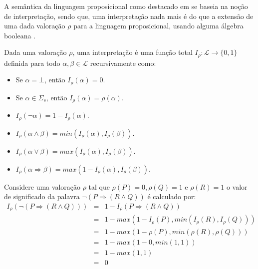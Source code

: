 A semântica da linguagem proposicional como destacado em \cite{joaoPavao2014} se baseia na noção de interpretação, sendo que, uma interpretação nada mais é do que a extensão de uma dada valoração $\rho$ para a linguagem proposicional, usando alguma álgebra booleana \cite{boole1854, boole1957}.

\begin{definicao}[Interpretação]\label{def:interpretacao}
  Dada uma valoração $\rho$, uma interpretação é uma função total $I_\rho : \mathcal{L} \rightarrow \{0,1\}$ definida para todo $\alpha, \beta \in \mathcal{L}$ recursivamente como:
  \begin{itemize}
       \item Se $\alpha = \bot$, então $I_\rho(\alpha) = 0$.
       \item Se $\alpha \in \Sigma_s$, então $I_\rho(\alpha) = \rho(\alpha)$.
       \item $I_\rho(\neg \alpha) = 1 - I_\rho(\alpha)$.
       \item $I_\rho(\alpha \land \beta) = min(I_\rho(\alpha), I_\rho(\beta))$.
       \item $I_\rho(\alpha \lor \beta) = max(I_\rho(\alpha), I_\rho(\beta))$.
       \item $I_\rho(\alpha \Rightarrow \beta) = max(1 - I_\rho(\alpha), I_\rho(\beta))$.
  \end{itemize}
\end{definicao}

\begin{exemplo}
  Considere uma valoração $\rho$ tal que $\rho(P) = 0, \rho(Q) = 1$ e $\rho(R) = 1$ o valor de significado da palavra $\neg(P \Rightarrow (R \land Q))$ é calculado por:
  \begin{eqnarray*}\label{eq:ExemploValoracaoA}
    I_\rho(\neg(P \Rightarrow (R \land Q))) & = & 1 - I_\rho(P \Rightarrow (R \land Q))\\
    & = & 1 - max(1 - I_\rho(P), min(I_\rho(R), I_\rho(Q)))\\
    & = & 1 - max(1 - \rho(P), min(\rho(R), \rho(Q)))\\
    & = & 1 - max(1 - 0, min(1, 1))\\
    & = & 1 - max(1, 1)\\
    & = & 0
  \end{eqnarray*}
\end{exemplo}

